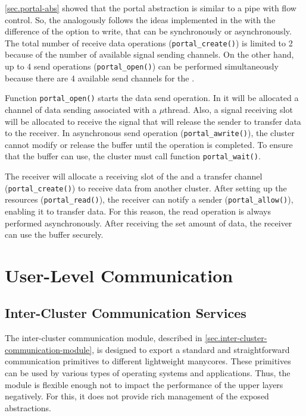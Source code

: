 				\autoref{sec.portal-abs} showed that the portal abstraction is similar to
				a \posix pipe with flow control.
				So, the \portal analogously follows the ideas implemented
				in the \mailbox with the difference of the option to write,
				that can be synchronously or asynchronously.
				The total number of receive data operations (\texttt{portal\_create()})
				is limited to 2 because of the number of available signal sending channels.
				On the other hand, up to 4 send operations (\texttt{portal\_open()})
				can be performed simultaneously because there are 4 available send
				channels for the \portal.

				Function \texttt{portal\_open()} starts the data send operation.
				In it will be allocated a channel of data sending associated with
				a $\mu$thread.
				Also, a signal receiving slot will be allocated to receive the
				signal that will release the sender to transfer data to the receiver.
				In asynchronous send operation (\texttt{portal\_awrite()}), the cluster
				cannot modify or release the buffer until the operation is completed.
				To ensure that the buffer can use, the cluster must call function \texttt{portal\_wait()}.

				The receiver will allocate a receiving slot of the \dnoc and a transfer
				channel (\texttt{portal\_create()}) to receive data from another cluster.
				After setting up the resources (\texttt{portal\_read()}), the receiver
				can notify a sender (\texttt{portal\_allow()}), enabling it to transfer data.
				For this reason, the read operation is always performed asynchronously.
				After receiving the set amount of data, the receiver can use the buffer securely.

	
	\section{User-Level Communication}
	\label{sec.comm-services}

		\subsection{Inter-Cluster Communication Services}
		\label{sec.inter-cluster-communication-module}

			The inter-cluster communication module, described in \autoref{sec.inter-cluster-communication-module},
			is designed to export a standard and straightforward communication
			primitives to different lightweight manycores.
			These primitives can be used by various types of operating systems
			and applications.
			Thus, the module is flexible enough not to impact the performance
			of the upper layers negatively.
			For this, it does not provide rich management of the exposed abstractions.

